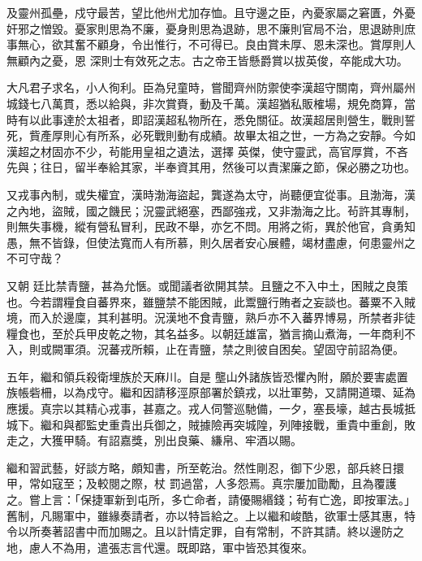 \begin{pinyinscope}
 及靈州孤壘，戍守最苦，望比他州尤加存恤。且守邊之臣，內憂家屬之窘匱，外憂奸邪之憎毀。憂家則思為不廉，憂身則思為退跡，思不廉則官局不治，思退跡則庶事無心，欲其奮不顧身，令出惟行，不可得已。良由賞未厚、恩未深也。賞厚則人無顧內之憂，恩
 深則士有效死之志。古之帝王皆懸爵賞以拔英俊，卒能成大功。



 大凡君子求名，小人徇利。臣為兒童時，嘗聞齊州防禦使李漢超守關南，齊州屬州城錢七八萬貫，悉以給與，非次賞賚，動及千萬。漢超猶私販榷場，規免商算，當時有以此事達於太祖者，即詔漢超私物所在，悉免關征。故漢超居則營生，戰則誓死，貲產厚則心有所系，必死戰則動有成績。故畢太祖之世，一方為之安靜。今如漢超之材固亦不少，茍能用皇祖之遺法，選擇
 英傑，使守靈武，高官厚賞，不吝先與；往日，留半奉給其家，半奉資其用，然後可以責潔廉之節，保必勝之功也。



 又戎事內制，或失權宜，漢時渤海盜起，龔遂為太守，尚聽便宜從事。且渤海，漢之內地，盜賊，國之饑民；況靈武絕塞，西鄙強戎，又非渤海之比。茍許其專制，則無失事機，縱有營私冒利，民政不舉，亦乞不問。用將之術，異於他官，貪勇知愚，無不皆錄，但使法寬而人有所慕，則久居者安心展體，竭材盡慮，何患靈州之不可守哉？



 又朝
 廷比禁青鹽，甚為允愜。或聞議者欲開其禁。且鹽之不入中土，困賊之良策也。今若謂糧食自蕃界來，雖鹽禁不能困賊，此鬻鹽行賄者之妄談也。蕃粟不入賊境，而入於邊廩，其利甚明。況漢地不食青鹽，熟戶亦不入蕃界博易，所禁者非徒糧食也，至於兵甲皮乾之物，其名益多。以朝廷雄富，猶言摘山煮海，一年商利不入，則或闕軍須。況蕃戎所賴，止在青鹽，禁之則彼自困矣。望固守前詔為便。



 五年，繼和領兵殺衛埋族於天麻川。自是
 壟山外諸族皆恐懼內附，願於要害處置族帳砦柵，以為戍守。繼和因請移涇原部署於鎮戎，以壯軍勢，又請開道環、延為應援。真宗以其精心戎事，甚嘉之。戎人伺警巡馳備，一夕，塞長壕，越古長城抵城下。繼和與都監史重貴出兵御之，賊據險再突城隍，列陣接戰，重貴中重創，敗走之，大獲甲騎。有詔嘉獎，別出良藥、縑帛、牢酒以賜。



 繼和習武藝，好談方略，頗知書，所至乾治。然性剛忍，御下少恩，部兵終日擐甲，常如寇至；及較閱之際，杖
 罰過當，人多怨焉。真宗屢加勖勵，且為覆護之。嘗上言：「保捷軍新到屯所，多亡命者，請優賜緡錢；茍有亡逸，即按軍法。」舊制，凡賜軍中，雖緣奏請者，亦以特旨給之。上以繼和峻酷，欲軍士感其惠，特令以所奏著詔書中而加賜之。且以計情定罪，自有常制，不許其請。終以邊防之地，慮人不為用，遣張志言代還。既即路，軍中皆恐其復來。




\end{pinyinscope}
